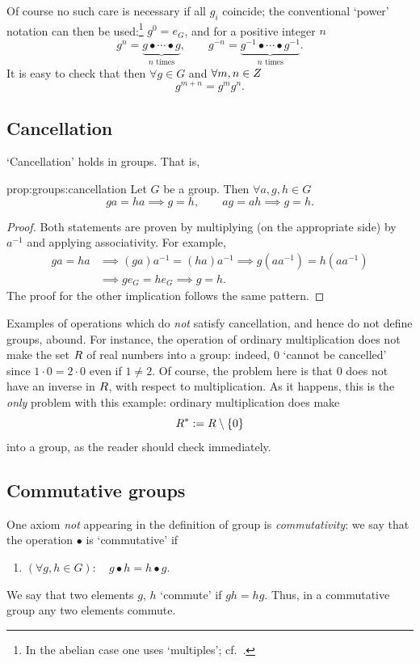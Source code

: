 Of course no such care is necessary if all $g_i$ coincide; the
conventional `power' notation can then be used:\footnote{In the
  abelian case one uses `multiples'; cf.\
  .} $g^0 = e_G$, and for a
positive integer $n$
\[
  g^n = \underbrace{g \bullet \cdots \bullet g}_{n \text{ times}}, \qquad g^{-n} =
  \underbrace{g^{-1} \bullet \cdots \bullet g^{-1}}_{n \text{ times}}.
\]
It is easy to check that then $\forall g \in G$ and
$\forall m, n \in Z$
\[
  g^{m+n} = g^m g^n.
\]

\subsection{Cancellation}
\label{subsec:groups:cancellation}
`Cancellation' holds in groups. That is,

\begin{prop}{}{prop:groups:cancellation}
  Let $G$ be a group. Then $\forall a, g, h \in G$
  \[
    ga = ha \implies g = h, \qquad ag = ah \implies g = h.
  \]
\end{prop}
\begin{proof}
  Both statements are proven by multiplying (on the appropriate side)
  by $a^{-1}$ and applying associativity. For example,
  \begin{align*}
    ga = ha &\implies (ga)a^{-1} = (ha)a^{-1} \implies g(aa^{-1}) = h(aa^{-1}) \\
            &\implies ge_G = he_G \implies g = h.
  \end{align*}
  The proof for the other implication follows the same pattern.
\end{proof}

Examples of operations which do \emph{not} satisfy cancellation, and
hence do not define groups, abound. For instance, the operation of
ordinary multiplication does not make the set $R$ of real numbers
into a group: indeed, $0$ `cannot be cancelled' since
$1 \cdot 0 = 2 \cdot 0$ even if $1 \neq 2$. Of course, the problem
here is that $0$ does not have an inverse in $R$, with respect to
multiplication. As it happens, this is the \emph{only} problem with
this example: ordinary multiplication does make
\[
  R^* := R \mathbin{\backslash} \{0\}
\]
into a group, as the reader should check immediately.

\subsection{Commutative groups}
\label{subsec:groups:commutative-groups}
One axiom \emph{not} appearing in the definition of group is
\emph{commutativity}: we say that the operation $\bullet$ is
`commutative' if
\begin{enumerate}[label=(\roman*),start=4]
\item $(\forall g, h \in G) \colon \quad g \bullet h = h \bullet g.$
\end{enumerate}
We say that two elements $g$, $h$ `commute' if $gh = hg$. Thus, in a
commutative group any two elements commute.

